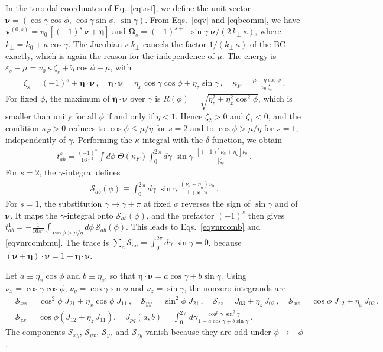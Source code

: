 \documentclass[aps,prb,onecolumn,nofootinbib,citeautoscript,10pt]{revtex4-2}
\newcommand{\bs}[1]{\boldsymbol{#1}}
\def \nn{\nonumber \\}
\begin{document}
In the toroidal coordinates of Eq.~\eqref{eqtrsf}, we define the unit vector $\bs\nu=(\cos\gamma\cos\phi,\,\cos\gamma\sin\phi,\,\sin\gamma)$. From Eqs.~\eqref{eqv} and \eqref{eqbcomm}, we have $\bs v^{(0,s)}=v_0\,[(-1)^s\,\bs\nu+\bs\eta]$ and $\bs\Omega_s=(-1)^{s+1}\,\sin\gamma\;\bs\nu/(2\,k_\perp\,\kappa)$, where $k_\perp=k_0+\kappa\cos\gamma$. The Jacobian $\kappa\,k_\perp$ cancels the factor $1/(k_\perp\,\kappa)$ of the BC exactly, which is again the reason for the independence of $\mu$. The energy is $\varepsilon_s-\mu=v_0\,\kappa\,\zeta_s+\tilde\eta\cos\phi-\mu$, with
\begin{align}
\zeta_s=(-1)^s+\bs\eta\cdot\bs\nu\,, \quad \bs\eta\cdot\bs\nu = \eta_x\cos\gamma\cos\phi+\eta_z\sin\gamma\,, \quad
\kappa_F = \frac{\mu-\tilde\eta\cos\phi}{v_0\,\zeta_s}\,.
\end{align}
For fixed $\phi$, the maximum of $\bs\eta\cdot\bs\nu$ over $\gamma$ is $R(\phi)=\sqrt{\eta_z^2+\eta_x^2\cos^2\phi}$, which is smaller than unity for all $\phi$ if and only if $\eta<1$. Hence $\zeta_2>0$ and $\zeta_1<0$, and the condition $\kappa_F>0$ reduces to $\cos\phi\le\mu/\tilde\eta$ for $s=2$ and to $\cos\phi>\mu/\tilde\eta$ for $s=1$, independently of $\gamma$. Performing the $\kappa$-integral with the $\delta$-function, we obtain
\begin{align}
t^s_{ab} = \frac{(-1)^s}{16\,\pi^3} \int d\phi\; \Theta(\kappa_F) \int_0^{2\,\pi} d\gamma\; \sin\gamma\; \frac{\left[(-1)^s\,\nu_a+\eta_a\right]\nu_b}{|\zeta_s|}\,.
\end{align}
For $s=2$, the $\gamma$-integral defines
\begin{align}
\label{eqSab}
\mathscr S_{ab}(\phi) \equiv \int_0^{2\,\pi} d\gamma\; \sin\gamma\; \frac{(\nu_a+\eta_a)\,\nu_b}{1+\bs\eta\cdot\bs\nu}\,.
\end{align}
For $s=1$, the substitution $\gamma\to\gamma+\pi$ at fixed $\phi$ reverses the sign of $\sin\gamma$ and of $\bs\nu$. It maps the $\gamma$-integral onto $\mathscr S_{ab}(\phi)$, and the prefactor $(-1)^s$ then gives $t^1_{ab}=-\frac{1}{16\pi^3}\int_{\cos\phi>\mu/\tilde\eta}d\phi\,\mathscr S_{ab}(\phi)$. This leads to Eqs.~\eqref{eqvnrcomb} and \eqref{eqvnrcombmu}. The trace is $\sum_a\mathscr S_{aa}=\int_0^{2\pi}d\gamma\,\sin\gamma=0$, because $(\bs\nu+\bs\eta)\cdot\bs\nu=1+\bs\eta\cdot\bs\nu$.

Let $a\equiv\eta_x\cos\phi$ and $b\equiv\eta_z$, so that $\bs\eta\cdot\bs\nu=a\cos\gamma+b\sin\gamma$. Using $\nu_x=\cos\gamma\cos\phi$, $\nu_y=\cos\gamma\sin\phi$ and $\nu_z=\sin\gamma$, the nonzero integrands are
\begin{align}
\label{eqSabexp}
& \mathscr S_{xx} = \cos^2\phi\;J_{21}+\eta_x\cos\phi\;J_{11} \,, \quad
\mathscr S_{yy} = \sin^2\phi\;J_{21} \,, \quad
\mathscr S_{zz} = J_{03}+\eta_z\,J_{02} \,, \quad
\mathscr S_{xz} = \cos\phi\;J_{12}+\eta_x\,J_{02} \,, \nn &
\mathscr S_{zx} = \cos\phi \left( J_{12}+\eta_z\,J_{11} \right) ,\quad
J_{pq}(a,b) = \int_0^{2\,\pi} d\gamma
\frac{\cos^p\gamma\,\sin^q\gamma}{1+a\cos\gamma+b\sin\gamma}\,.
\end{align}
The components $\mathscr S_{xy}$, $\mathscr S_{yx}$, $\mathscr S_{yz}$ and $\mathscr S_{zy}$ vanish because they are odd under $\phi\to-\phi$.
\end{document}
